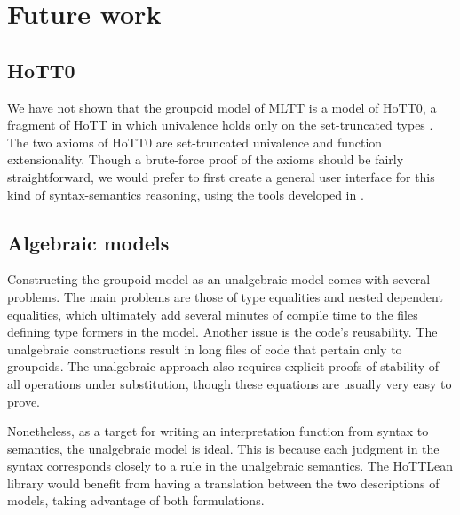 

\section{Future work}
\label{sec:algebraic-vs-elementary}

\subsection*{HoTT0}
We have not shown that the groupoid model of MLTT is a model of HoTT0,
a fragment of HoTT in which univalence holds only on the set-truncated types \cite{hua2025}. 
The two axioms of HoTT0 are set-truncated univalence and function extensionality.
Though a brute-force proof of the axioms should be fairly straightforward,
we would prefer to first create a general user interface
for this kind of syntax-semantics reasoning,
using the tools developed in \cite{nawrocki2026}.

\subsection*{Algebraic models}
Constructing the groupoid model as an unalgebraic model comes with several problems. 
The main problems are those of type equalities and nested dependent equalities,
which ultimately add several minutes of compile time to the files defining type formers in the model.
Another issue is the code's reusability.
The unalgebraic constructions result in long files of code that pertain only to groupoids.
The unalgebraic approach also requires explicit proofs of
stability of all operations under substitution,
though these equations are usually very easy to prove.

Nonetheless, as a target for writing an interpretation function from syntax to semantics,
the unalgebraic model is ideal.
This is because each judgment in the syntax corresponds closely to a rule
in the unalgebraic semantics.
The HoTTLean library would benefit from having
a translation between the two descriptions of models,
taking advantage of both formulations.


